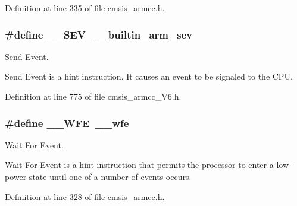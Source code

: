 Definition at line 335 of file cmsis\+\_\+armcc.\+h.

\subsubsection[{\texorpdfstring{\+\_\+\+\_\+\+S\+EV}{__SEV}}]{\setlength{\rightskip}{0pt plus 5cm}\#define \+\_\+\+\_\+\+S\+EV~\+\_\+\+\_\+builtin\+\_\+arm\+\_\+sev}\hypertarget{group___c_m_s_i_s___core___instruction_interface_gaab4f296d0022b4b10dc0976eb22052f9}{}\label{group___c_m_s_i_s___core___instruction_interface_gaab4f296d0022b4b10dc0976eb22052f9}


Send Event. 

Send Event is a hint instruction. It causes an event to be signaled to the C\+PU. 

Definition at line 775 of file cmsis\+\_\+armcc\+\_\+\+V6.\+h.

\subsubsection[{\texorpdfstring{\+\_\+\+\_\+\+W\+FE}{__WFE}}]{\setlength{\rightskip}{0pt plus 5cm}\#define \+\_\+\+\_\+\+W\+FE~\+\_\+\+\_\+wfe}\hypertarget{group___c_m_s_i_s___core___instruction_interface_gaac6cc7dd4325d9cb40d3290fa5244b3d}{}\label{group___c_m_s_i_s___core___instruction_interface_gaac6cc7dd4325d9cb40d3290fa5244b3d}


Wait For Event. 

Wait For Event is a hint instruction that permits the processor to enter a low-\/power state until one of a number of events occurs. 

Definition at line 328 of file cmsis\+\_\+armcc.\+h.

